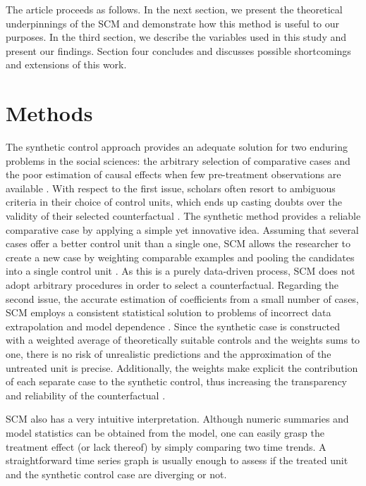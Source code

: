 \documentclass[a4paper,11pt]{article}
\begin{document}
The article proceeds as follows. In the next section, we present the theoretical underpinnings of the SCM and demonstrate how this method is useful to our purposes. In the third section, we describe the variables used in this study and present our findings. Section four concludes and discusses possible shortcomings and extensions of this work.

\section{Methods}

The synthetic control approach provides an adequate solution for two enduring problems in the social sciences: the arbitrary selection of comparative cases and the poor estimation of causal effects when few pre-treatment observations are available \citep{abadie2003, abadie2010}. With respect to the first issue, scholars often resort to ambiguous criteria in their choice of control units, which ends up casting doubts over the validity of their selected counterfactual \citep{abadie2011}. The synthetic method provides a reliable comparative case by applying a simple yet innovative idea. Assuming that several cases offer a better control unit than a single one, SCM allows the researcher to create a new case by weighting comparable examples and pooling the candidates into a single control unit \citep{abadie2010}. As this is a purely data-driven process, SCM does not adopt arbitrary procedures in order to select a counterfactual. Regarding the second issue, the accurate estimation of coefficients from a small number of cases, SCM employs a consistent statistical solution to problems of incorrect data extrapolation and model dependence \citep{ho2007}. Since the synthetic case is constructed with a weighted average of theoretically suitable controls and the weights sums to one, there is no risk of unrealistic predictions and the approximation of the untreated unit is precise. Additionally, the weights make explicit the contribution of each separate case to the synthetic control, thus increasing the transparency and reliability of the counterfactual \citep{abadie2014}. 

SCM also has a very intuitive interpretation. Although numeric summaries and model statistics can be obtained from the model, one can easily grasp the treatment effect (or lack thereof) by simply comparing two time trends. A straightforward time series graph is usually enough to assess if the treated unit and the synthetic control case are diverging or not. 
\end{document}
